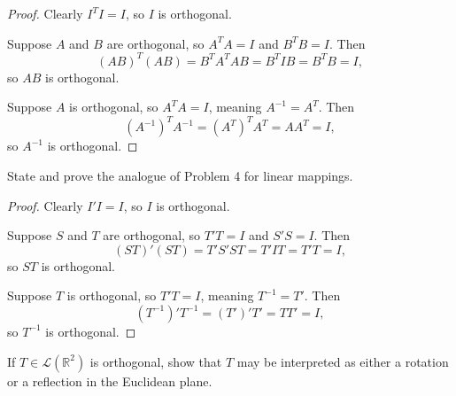 \begin{proof}
    Clearly $I^T I = I$, so $I$ is orthogonal.
    
    Suppose $A$ and $B$ are orthogonal, so $A^T A = I$ and $B^T B = I$. Then
    \[(AB)^T(AB) = B^T A^T A B = B^T I B = B^T B = I,\]
    so $AB$ is orthogonal.

    Suppose $A$ is orthogonal, so $A^T A = I$, meaning $A^{-1} = A^T$. Then
    \[(A^{-1})^T A^{-1} = (A^T)^T A^T = A A^T = I,\]
    so $A^{-1}$ is orthogonal.
\end{proof}

\begin{tcolorbox}[title=Problem 5, breakable]
State and prove the analogue of Problem 4 for linear mappings.
\end{tcolorbox}

\begin{proof}
    Clearly $I'I = I$, so $I$ is orthogonal.

    Suppose $S$ and $T$ are orthogonal, so $T'T = I$ and $S'S = I$. Then
    \[(ST)'(ST) = T' S' S T = T' I T = T' T = I,\]
    so $ST$ is orthogonal.

    Suppose $T$ is orthogonal, so $T'T = I$, meaning $T^{-1} = T'$. Then
    \[(T^{-1})' T^{-1} = (T')' T' = T T' = I,\]
    so $T^{-1}$ is orthogonal.
\end{proof}


\begin{tcolorbox}[title=Problem 6, breakable]
If $T \in \mathcal{L}(\mathbb{R}^2)$ is orthogonal, show that $T$ may be interpreted as either a rotation or a reflection in the Euclidean plane.
\end{tcolorbox}

